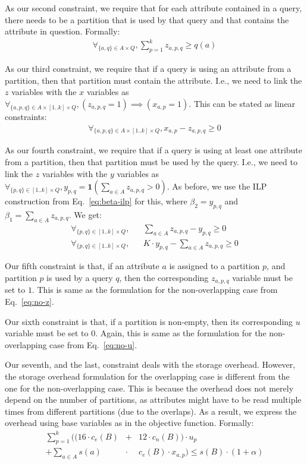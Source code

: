 As our second constraint, we require that for each attribute contained in a
query, there needs to be a partition that is used by that query and that
contains the attribute in question. Formally:
\begin{eqnarray}
\forall_{\{a,q\}\in A\times Q}, \sum_{p=1}^{k} z_{a,p,q} \geq q(a) 
\end{eqnarray}

\begin{sloppypar}
As our third constraint, we require that if a query is using an attribute from
a partition, then that partition must contain the attribute. I.e., we need
to link the $z$ variables with the $x$ variables as
$\forall_{\{a,p,q\}\in A\times [1..k]\times Q}, (z_{a,p,q} = 1) \implies 
(x_{a,p} = 1)$. This can be stated as linear constraints:
\begin{eqnarray}
\forall_{\{a,p,q\}\in A\times [1..k]\times Q}, x_{a,p} - z_{a,p,q} \geq 0 
\end{eqnarray}
\end{sloppypar}

As our fourth constraint, we require that if a query is using at least one
attribute from a partition, then that partition must be used by the query.
I.e., we need to link the $z$ variables with the $y$ variables as
$\forall_{\{p,q\}\in [1..k]\times Q}, y_{p,q} = \mathbf{1}(\sum_{a\in A}
z_{a,p,q}>0)$. As before, we use the ILP construction from
Eq.~\ref{eq:beta-ilp} for this, where $\beta_2=y_{p,q}$ and $\beta_1 =
\sum_{a\in A} z_{a,p,q}$. We get:
\begin{eqnarray}
\forall_{\{p,q\}\in [1..k]\times Q}, 
    &&  \sum_{a\in A} z_{a,p,q} - y_{p,q} \geq 0 \nonumber\\
\forall_{\{p,q\}\in [1..k]\times Q}, 
    &&  K\cdot y_{p,q} - \sum_{a\in A} z_{a,p,q} \geq 0 
\end{eqnarray}

Our fifth constraint is that, if an attribute $a$ is assigned to a partition
$p$, and partition $p$ is used by a query $q$, then the corresponding
$z_{a,p,q}$ variable must be set to $1$. This is same as the formulation for
the non-overlapping case from Eq.~\ref{eq:no-z}.

Our sixth constraint is that, if a partition is non-empty, then its
corresponding $u$ variable must be set to $0$. Again, this is same as the
formulation for the non-overlapping case from Eq.~\ref{eq:no-u}.

Our seventh, and the last, constraint deals with the storage overhead. However,
the storage overhead formulation for the overlapping case is different from 
the one for the non-overlapping case. This is because the overhead does not
merely depend on the number of partitions, as attributes might have to be read
multiple times from different partitions (due to the overlaps). As a result,
we express the overhead using base variables as in the objective function.
Formally:
\begin{eqnarray}
\sum_{p=1}^{k} \Big((16\cdot c_e(B) &+& 12 \cdot c_n(B)) \cdot u_p  \nonumber \\ 
+ \sum_{a\in A} s(a) \!\!&\cdot&\!\! c_e(B)\cdot x_{a,p} \Big) \leq s(B)\cdot (1+\alpha)
\end{eqnarray}

